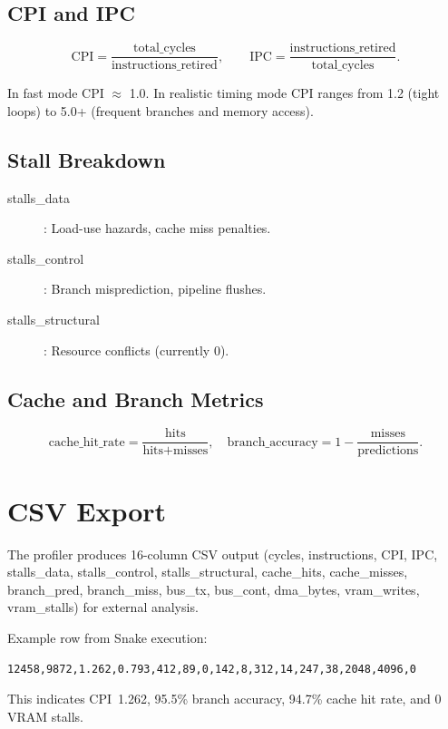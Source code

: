 \documentclass[12pt,a4paper,twoside]{book}
\theoremstyle{trinarytheorem}
\theoremstyle{trinarydefinition}
\newcommand{\code}[1]{\textsf{#1}}
\begin{document}
\subsection{CPI and IPC}

\[
\text{CPI} = \frac{\text{total\_cycles}}{\text{instructions\_retired}},\qquad
\text{IPC} = \frac{\text{instructions\_retired}}{\text{total\_cycles}}.
\]

In fast mode CPI $\approx$ 1.0. In realistic timing mode CPI ranges
from 1.2 (tight loops) to 5.0+ (frequent branches and memory access).

\subsection{Stall Breakdown}

\begin{description}
    \item[\code{stalls\_data}]: Load-use hazards, cache miss penalties.
    \item[\code{stalls\_control}]: Branch misprediction, pipeline flushes.
    \item[\code{stalls\_structural}]: Resource conflicts (currently 0).
\end{description}

\subsection{Cache and Branch Metrics}

\[
\text{cache\_hit\_rate} = \frac{\text{hits}}{\text{hits}+\text{misses}},\quad
\text{branch\_accuracy} = 1 - \frac{\text{misses}}{\text{predictions}}.
\]

\section{CSV Export}

The profiler produces 16-column CSV output (cycles, instructions, CPI,
IPC, stalls\_data, stalls\_control, stalls\_structural, cache\_hits,
cache\_misses, branch\_pred, branch\_miss, bus\_tx, bus\_cont,
dma\_bytes, vram\_writes, vram\_stalls) for external analysis.

Example row from Snake execution:

\begin{verbatim}
12458,9872,1.262,0.793,412,89,0,142,8,312,14,247,38,2048,4096,0
\end{verbatim}

This indicates CPI~1.262, 95.5\% branch accuracy, 94.7\% cache hit rate,
and 0 VRAM stalls.
\end{document}
